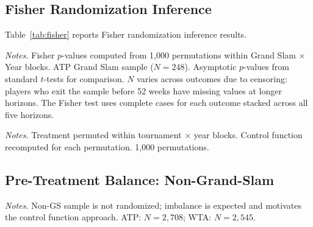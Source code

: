 \subsection{Fisher Randomization Inference}
\label{app:fisher}

Table~\ref{tab:fisher} reports Fisher randomization inference results.

\begin{table}[htbp]
\centering
\caption{Fisher Randomization Inference: Grand Slam Sample}
\label{tab:fisher}
\begin{threeparttable}
\small

\begin{tablenotes}
\footnotesize
\item \textit{Notes.} Fisher $p$-values computed from 1,000 permutations within Grand Slam $\times$ Year blocks. ATP Grand Slam sample ($N = 248$). Asymptotic $p$-values from standard $t$-tests for comparison. $N$ varies across outcomes due to censoring: players who exit the sample before 52 weeks have missing values at longer horizons. The Fisher test uses complete cases for each outcome stacked across all five horizons.
\end{tablenotes}
\end{threeparttable}
\end{table}

\begin{table}[htbp]
\centering
\caption{Fisher Randomization Inference: Non-Grand-Slam Sample}
\label{tab:fisher_nongs}
\begin{threeparttable}
\small

\begin{tablenotes}
\footnotesize
\item \textit{Notes.} Treatment permuted within tournament $\times$ year blocks. Control function recomputed for each permutation. 1,000 permutations.
\end{tablenotes}
\end{threeparttable}
\end{table}

\subsection{Pre-Treatment Balance: Non-Grand-Slam}
\label{app:balance_nongs}

\begin{table}[htbp]
\centering
\caption{Pre-Treatment Balance: Non-Grand-Slam Samples}
\label{tab:balance_nongs}
\begin{threeparttable}
\small

\begin{tablenotes}
\footnotesize
\item \textit{Notes.} Non-GS sample is not randomized; imbalance is expected and motivates the control function approach. ATP: $N = 2{,}708$; WTA: $N = 2{,}545$.
\end{tablenotes}
\end{threeparttable}
\end{table}


